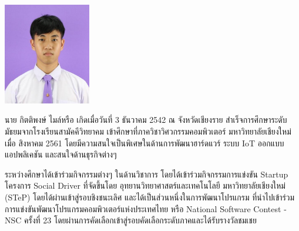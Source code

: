 \documentclass[semifinal]{cpecmu}
\begin{document}
\begin{biosketch}
\begin{center}
  \includegraphics[width=1.5in]{pic/ToonImg.jpg}  
\end{center}
นาย กิตติพงษ์ ไมล์หรือ เกิดเมื่อวันที่ 3 ธันวาคม 2542 ณ จังหวัดเชียงราย สำเร็จการศึกษาระดับมัธยมจากโรงเรียนสามัคคีวิทยาคม เข้าศึกษาที่ภาควิชาวิศวกรรมคอมพิวเตอร์ มหาวิทยาลัยเชียงใหม่ เมื่อ สิงหาคม 2561 โดยมีความสนใจเป็นพิเศษในด้านการพัฒนาฮาร์ดแวร์ ระบบ IoT ออกแบบแอปพลิเคชัน และสนใจด้านธุรกิจต่างๆ

ระหว่างศึกษาได้เข้าร่วมกิจกรรมต่างๆ ในด้านวิชาการ  โดยได้เข้าร่วมกิจกรรมการแข่งขัน Startup โครงการ Social Driver ที่จัดขึ้นโดย อุทยานวิทยาศาสตร์และเทคโนโลยี มหาวิทยาลัยเชียงใหม่ (STeP) โดยได้ผ่านเข้าสู่รอบชิงชนะเลิศ และได้เป็นส่วนหนึ่งในการพัฒนาโปรแกรม ที่นำไปเข้าร่วมการแข่งขันพัฒนาโปรแกรมคอมพิวเตอร์แห่งประเทศไทย 
หรือ National Software Contest - NSC ครั้งที่ 23 โดยผ่านการคัดเลือกเข้าสู่รอบคัดเลือกระดับภาคและได้รับรางวัลชมเชย
\end{biosketch}
\fi %
\end{document}

